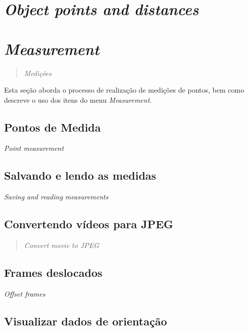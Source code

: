 \documentclass[
  12pt,
  letterpaper,
  DIV=11,
  numbers=noendperiod]{scrreprt}
\begin{document}
\section{\texorpdfstring{\emph{Object points and
distances}}{Object points and distances}}\label{object-points-and-distances-1}

\section{\texorpdfstring{\emph{Measurement}}{Measurement}}\label{measurement}

\begin{quote}
\emph{Medições}
\end{quote}

Esta seção aborda o processo de realização de medições de pontos, bem
como descreve o uso dos itens do menu \emph{Measurement}.

\subsection{Pontos de Medida}\label{pontos-de-medida}

\emph{Point measurement}

\subsection{Salvando e lendo as
medidas}\label{salvando-e-lendo-as-medidas-1}

\emph{Saving and reading measurements}

\subsection{Convertendo vídeos para
JPEG}\label{convertendo-vuxeddeos-para-jpeg-1}

\begin{quote}
\emph{Convert movie to JPEG}
\end{quote}

\subsection{Frames deslocados}\label{frames-deslocados-1}

\emph{Offset frames}

\subsection{Visualizar dados de
orientação}\label{visualizar-dados-de-orientauxe7uxe3o-1}
\end{document}
